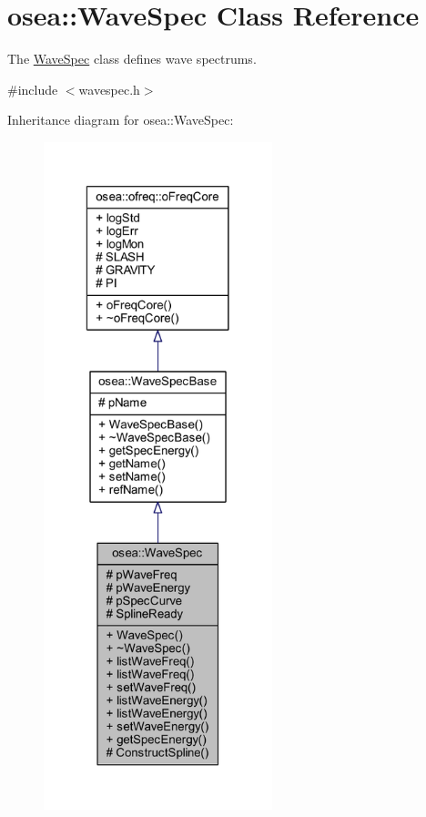 \hypertarget{classosea_1_1_wave_spec}{\section{osea\-:\-:Wave\-Spec Class Reference}
\label{classosea_1_1_wave_spec}
}


The \hyperlink{classosea_1_1_wave_spec}{Wave\-Spec} class defines wave spectrums.  




{\ttfamily \#include $<$wavespec.\-h$>$}



Inheritance diagram for osea\-:\-:Wave\-Spec\-:
\nopagebreak
\begin{figure}[H]
\begin{center}
\leavevmode
\includegraphics[height=550pt]{classosea_1_1_wave_spec__inherit__graph}
\end{center}
\end{figure}
